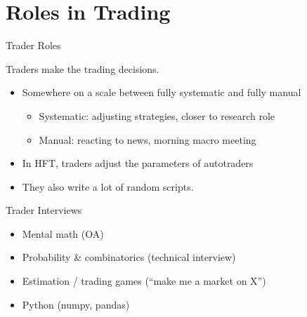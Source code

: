 \section{Roles in Trading}

\begin{frame}{Trader Roles}
  \begin{sqt:definition}
    Traders make the trading decisions.
  \end{sqt:definition}

  \begin{itemize}
    \item Somewhere on a scale between fully systematic and fully manual
    \begin{itemize}
      \item Systematic: adjusting strategies, closer to research role
      \item Manual: reacting to news, morning macro meeting
    \end{itemize}

    \item In HFT, traders adjust the parameters of autotraders
    \item They also write a lot of random scripts.
  \end{itemize}
\end{frame}

\begin{frame}{Trader Interviews}
  \begin{itemize}
    \item Mental math (OA)
    \item Probability \& combinatorics (technical interview)
    \item Estimation / trading games (``make me a market on X'')
    \item Python (numpy, pandas)
  \end{itemize}
\end{frame}

